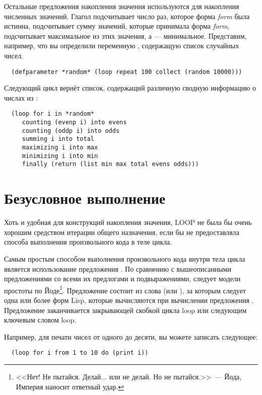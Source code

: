 Остальные предложения накопления значения используются для накопления численных
значений. Глагол  подсчитывает число раз, которое форма \textit{form} была
истинна,  подсчитывает сумму значений, которые принимала форма \textit{form},
 подсчитывает максимальное из этих значения, а  ---
минимальное. Представим, например, что вы определили переменную ,
содержащую список случайных чисел.

\begin{lstlisting}
  (defparameter *random* (loop repeat 100 collect (random 10000)))
\end{lstlisting}

Следующий цикл вернёт список, содержащий различную сводную информацию о числах из
:

\begin{lstlisting}
  (loop for i in *random*
     counting (evenp i) into evens
     counting (oddp i) into odds
     summing i into total
     maximizing i into max
     minimizing i into min
     finally (return (list min max total evens odds)))
\end{lstlisting}

\section{Безусловное выполнение}

Хоть и удобная для конструкций накопления значения, LOOP не была бы очень хорошим
средством итерации общего назначения, если бы не предоставляла способа выполнения
произвольного кода в теле цикла.

Самым простым способом выполнения произвольного кода внутри тела цикла является
использование предложения . По сравнению с вышеописанными предложениями со всеми
их предлогами и подвыражениями,  следует модели простоты по Йоде\footnote{<<Нет!
  Не пытайся. Делай... или не делай. Но не пытайся.>>~--- Йода, Империя наносит ответный
  удар.}. Предложение  состоит из слова  (или ), за которым
следует одна или более форм Lisp, которые вычисляются при вычислении предложения
. Предложение  заканчивается закрывающей скобкой цикла loop или
следующим ключевым словом loop.

Например, для печати чисел от одного до десяти, вы можете записать следующее:

\begin{lstlisting}
  (loop for i from 1 to 10 do (print i))
\end{lstlisting}


